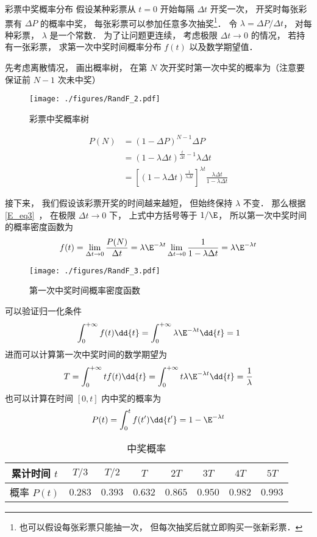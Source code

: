 \begin{example}{彩票中奖概率分布}
假设某种彩票从 $t = 0$ 开始每隔 $\Delta t$ 开奖一次， 开奖时每张彩票有 $\Delta P$ 的概率中奖， 每张彩票可以参加任意多次抽奖\footnote{也可以假设每张彩票只能抽一次， 但每次抽奖后就立即购买一张新彩票．}． 令 $\lambda = {\Delta P}/{\Delta t}$， 对每种彩票， $\lambda$ 是一个常数． 为了让问题更连续， 考虑极限 $\Delta t\to 0$ 的情况， 若持有一张彩票， 求第一次中奖时间概率分布 $f(t)$ 以及数学期望值．

先考虑离散情况， 画出概率树， 在第 $N$ 次开奖时第一次中奖的概率为（注意要保证前 $N-1$ 次未中奖）
\begin{figure}[ht]
\centering
\texttt{[image: ./figures/RandF\_2.pdf]}
\caption{彩票中奖概率树} \label{RandF_fig2}
\end{figure}
\begin{equation}
\begin{aligned}
P(N) &= (1-\Delta P)^{N-1} \Delta P\\
&= (1-\lambda\Delta t)^{\frac{t}{\Delta t}-1} \lambda\Delta t\\
&= [(1-\lambda\Delta t)^{\frac{1}{\lambda\Delta t}}]^{\lambda t} \frac{\lambda\Delta t}{1-\lambda\Delta t}
\end{aligned}
\end{equation}

接下来， 我们假设该彩票开奖的时间越来越短， 但始终保持 $\lambda$ 不变． 那么根据\autoref{E_eq3}~， 在极限 $\Delta t\to 0$ 下， 上式中方括号等于 $1/\E$， 所以第一次中奖时间的概率密度函数为
\begin{equation}
f(t) = \lim_{\Delta t\to 0} \frac{P(N)}{\Delta t} = \lambda\E^{-\lambda t}\lim_{\Delta t\to 0} \frac{1}{1-\lambda\Delta t} = \lambda\E^{-\lambda t}
\end{equation}
\begin{figure}[ht]
\centering
\texttt{[image: ./figures/RandF\_3.pdf]}
\caption{第一次中奖时间概率密度函数} \label{RandF_fig3}
\end{figure}

可以验证归一化条件
\begin{equation}
\int_0^{+\infty} f(t) \dd{t} = \int_0^{+\infty} \lambda\E^{-\lambda t} \dd{t} = 1
\end{equation}
进而可以计算第一次中奖时间的数学期望为
\begin{equation}
T = \int_0^{+\infty} t f(t) \dd{t} = \int_0^{+\infty}t \lambda\E^{-\lambda t} \dd{t} = \frac{1}{\lambda}
\end{equation}
也可以计算在时间 $[0, t]$ 内中奖的概率为
\begin{equation}
P(t) = \int_0^{t} f(t') \dd{t'} = 1 - \E^{-\lambda t}
\end{equation}
\begin{table}[ht]
\centering
\caption{中奖概率}\label{RandF_tab2}
\begin{tabular}{|c|c|c|c|c|c|c|c|}
\hline
累计时间 $t$ & $T/3$  & $T/2$  & $T$     & $2T$ &     $3T$   &  $4T$   & $5T$\\
\hline
概率 $P(t)$ & $0.283$ & $0.393$ & $0.632$ & $0.865$ & $0.950$ & $0.982$ & $0.993$\\
\hline
\end{tabular}
\end{table}
\end{example}
